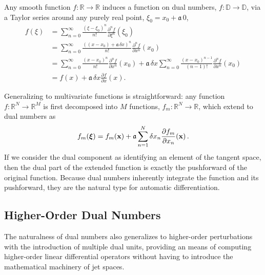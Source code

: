 Any smooth function $f : \mathbb{R} \rightarrow \mathbb{R}$ induces a function on 
dual numbers, $f : \mathbb{D} \rightarrow \mathbb{D}$, via a Taylor series around any 
purely real point, $\xi_{0} = x_{0} + \mathfrak{a} \, 0$,
%
\begin{align*}
f \! \left( \xi \right) 
&= 
\sum_{n = 0}^{\infty} \frac{ \left( \xi - \xi_{0} \right)^{n} }{n!} 
\frac{ \partial^{n} f }{ \partial \xi^{n} } \! \left( \xi_{0} \right) 
\\
&= 
\sum_{n = 0}^{\infty} \frac{ \left( \left( x - x_{0} \right) + \mathfrak{a} \, \delta x \right)^{n} }{n!} 
\frac{ \partial^{n} f }{ \partial x^{n} } \! \left( x_{0} \right)
\\
&= 
\sum_{n = 0}^{\infty} \frac{ \left( x - x_{0} \right)^{n} }{n!} 
\frac{ \partial^{n} f }{ \partial x^{n} } \! \left( x_{0} \right)
+ \mathfrak{a} \, \delta x \sum_{n = 0}^{\infty} \frac{ \left( x - x_{0} \right)^{n - 1} }{\left( n - 1 \right)!} 
\frac{ \partial^{n} f }{ \partial x^{n} } \! \left( x_{0} \right) 
\\
&= 
f \! \left( x \right) 
+ \mathfrak{a} \, \delta x \frac{ \partial f }{ \partial x } \! \left( x \right).
\end{align*}

Generalizing to multivariate functions is straightforward: any function 
$f : \mathbb{R}^{N} \rightarrow \mathbb{R}^{M}$ is first decomposed into $M$
functions, $f_{m} : \mathbb{R}^{N} \rightarrow \mathbb{R}$, which extend
to dual numbers as
%
\begin{equation} \label{dual_function}
f_{m} \! \left( \mbox{\boldmath{$\xi$}} \right) = f_{m} \! \left( \mathbf{x} \right) 
+ \mathfrak{a} \sum_{n = 1}^{N} 
\delta x_{n} \frac{ \partial f_{m} }{ \partial x_{n} } \! \left( \mathbf{x} \right).
\end{equation}
%
If we consider the dual component as identifying an element of the tangent
space, then the dual part of the extended function is exactly the pushforward 
of the original function.  Because dual numbers inherently integrate the function 
and its pushforward, they are the natural type for automatic differentiation.

\subsection{Higher-Order Dual Numbers}

The naturalness of dual numbers also generalizes to higher-order perturbations
with the introduction of multiple dual units, providing an means of computing
higher-order linear differential operators without having to introduce the mathematical
machinery of jet spaces.

